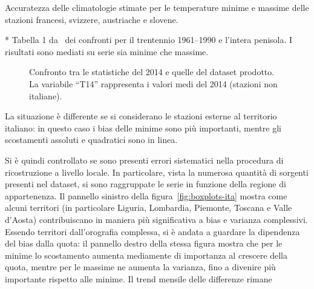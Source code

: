\begin{table}[ht]
  \centering
  \begin{adjustbox}{max width=\textwidth}

    \begin{threeparttable}
      \caption{Accuratezza delle climatologie stimate per le temperature minime e massime delle stazioni francesi, svizzere, austriache e slovene.}\label{tab:bias-non-ita}
      
      \begin{tablenotes}
      \item[*] Tabella 1 da~\cite[p.~10]{brunettiHighresolutionTemperatureClimatology2014} dei confronti per il trentennio 1961--1990 e l'intera penisola. I risultati sono mediati su serie sia minime che massime.
      \end{tablenotes}
    \end{threeparttable}
  \end{adjustbox}
\end{table}

\begin{figure}
  \centering
  
  \caption{Confronto tra le statistiche del 2014 e quelle del dataset prodotto. La variabile ``T14'' rappresenta i valori medi del 2014 (stazioni non italiane).}\label{fig:diffs-mese-nonita}
\end{figure}
La situazione è differente se si considerano le stazioni esterne al territorio italiano: in questo caso i bias delle minime sono più importanti, mentre gli scostamenti assoluti e quadratici sono in linea.

Si è quindi controllato se sono presenti errori sistematici nella procedura di ricostruzione a livello locale. In particolare, vista la numerosa quantità di sorgenti presenti nel dataset, si sono raggruppate le serie in funzione della regione di appartenenza. Il pannello sinistro della figura~\ref{fig:boxplots-ita} mostra come alcuni territori (in particolare Liguria, Lombardia, Piemonte, Toscana e Valle d'Aosta) contribuiscano in maniera più significativa a bias e varianza complessivi. Essendo territori dall'orografia complessa, si è andata a guardare la dipendenza del bias dalla quota: il pannello destro della stessa figura mostra che per le minime lo scostamento aumenta mediamente di importanza al crescere della quota, mentre per le massime ne aumenta la varianza, fino a divenire più importante rispetto alle minime. Il trend mensile delle differenze rimane

